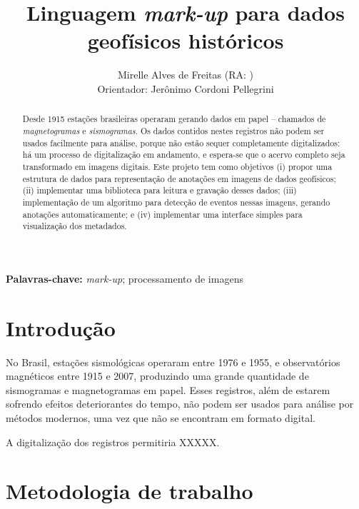\documentclass{article}
\title{Linguagem {\em mark-up} para dados geofísicos históricos}
\author{Mirelle Alves de Freitas (RA: )\\
  Orientador: Jerônimo Cordoni Pellegrini}
\begin{document}
\maketitle

\begin{abstract}
  Desde 1915 estações brasileiras operaram gerando dados
  em papel -- chamados de {\em magnetogramas} e {\em sismogramas}. Os
  dados contidos nestes registros não podem ser usados facilmente para
  análise, porque não estão sequer completamente digitalizados: há um
  processo de 
  digitalização em andamento, e espera-se que o acervo completo seja
  transformado em imagens digitais.
  Este projeto tem como objetivos (i) propor uma estrutura de dados para
  representação de anotações em imagens de dados geofísicos; (ii)
  implementar uma biblioteca para leitura e gravação desses dados;
  (iii) implementação de um algoritmo para detecção de eventos nessas
  imagens, gerando anotações automaticamente; e (iv)  implementar uma
  interface simples para visualização dos metadados.
\end{abstract}


\begin{center}
  \begin{minipage}{10cm}
    \begin{center}
      \textbf{Palavras-chave:} {\em mark-up}; processamento de imagens
    \end{center}
  \end{minipage}
\end{center}

\section{Introdução}

No Brasil, estações sismológicas operaram entre 1976 e 1955, e
observatórios magnéticos entre 1915 e 2007, produzindo uma grande
quantidade de sismogramas e magnetogramas em papel. Esses registros, 
além de estarem sofrendo efeitos deteriorantes do tempo, não podem ser
usados para análise por métodos modernos, uma vez que não se encontram
em formato digital.

A digitalização dos registros permitiria XXXXX.



\section{Metodologia de trabalho}
\end{document}
